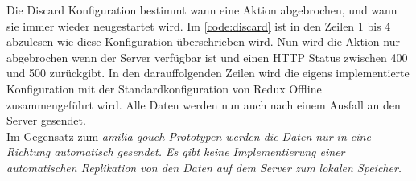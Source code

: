 \begin{center}
  
\end{center}
Die Discard Konfiguration bestimmt wann eine Aktion abgebrochen, und wann sie immer wieder neugestartet wird. Im \autoref{code:discard} ist in den Zeilen 1 bis 4 abzulesen wie diese Konfiguration überschrieben wird. Nun wird die Aktion nur abgebrochen wenn der Server verfügbar ist und einen \gls{HTTP} Status zwischen 400 und 500 zurückgibt.
In den darauffolgenden Zeilen wird die eigens implementierte Konfiguration mit der Standardkonfiguration von Redux Offline zusammengeführt wird.
Alle Daten werden nun auch nach einem Ausfall an den Server gesendet.\\
Im Gegensatz zum \it{amilia-qouch} Prototypen werden die Daten nur in eine Richtung automatisch gesendet. Es gibt keine Implementierung einer automatischen Replikation von den Daten auf dem Server zum lokalen Speicher.